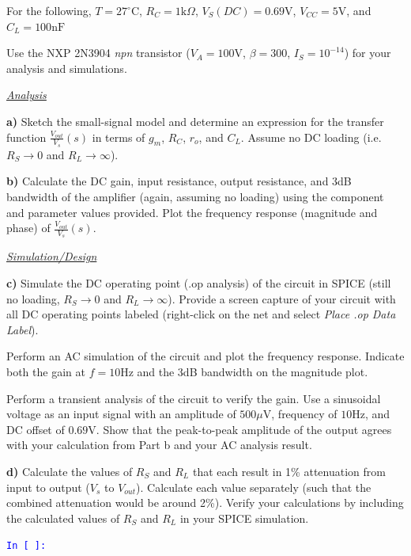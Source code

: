 \documentclass[11pt, a4paper]{article}
\begin{document}
For the following, $T = 27^\circ\text{C}$, $R_C = 1\text{k}\Omega$, $V_S(DC) = 0.69\text{V}$, $V_{CC} = 5\text{V}$, and $C_L = 100\text{nF}$

Use the NXP 2N3904 \textit{npn} transistor ($V_A = 100\text{V}$, $\beta = 300$, $I_S = 10^{-14}$) for your analysis and simulations.

\vspace{1.5em}
\underline{\textit{Analysis}}

\textbf{a)} Sketch the small-signal model and determine an expression for the transfer function $\frac{V_{out}}{V_s}(s)$ in terms of $g_m$, $R_C$, $r_o$, and $C_L$. Assume no DC loading (i.e. $R_S \rightarrow 0$ and $R_L \rightarrow \infty$).

\textbf{b)} Calculate the DC gain, input resistance, output resistance, and 3dB bandwidth of the amplifier (again, assuming no loading) using the component and parameter values provided. Plot the frequency response (magnitude and phase) of $\frac{V_{out}}{V_s}(s)$.

\vspace{1.5em}
\underline{\textit{Simulation/Design}}

\textbf{c)} Simulate the DC operating point (.op analysis) of the circuit in SPICE (still no loading, $R_S \rightarrow 0$ and $R_L \rightarrow \infty$). Provide a screen capture of your circuit with all DC operating points labeled (right-click on the net and select \textit{Place .op Data Label}).

Perform an AC simulation of the circuit and plot the frequency response. Indicate both the gain at $f = 10\text{Hz}$ and the 3dB bandwidth on the magnitude plot.

Perform a transient analysis of the circuit to verify the gain. Use a sinusoidal voltage as an input signal with an amplitude of $500\mu\text{V}$, frequency of $10\text{Hz}$, and DC offset of $0.69\text{V}$. Show that the peak-to-peak amplitude of the output agrees with your calculation from Part b and your AC analysis result.

\textbf{d)} Calculate the values of $R_S$ and $R_L$ that each result in 1\% attenuation from input to output ($V_s$ to $V_{out}$). Calculate each value separately (such that the combined attenuation would be around 2\%). Verify your calculations by including the calculated values of $R_S$ and $R_L$ in your SPICE simulation.

\vspace{2em}

\texttt{\textcolor{blue}{In [ ]:}} \framebox[\linewidth]{\rule{0pt}{1.5ex}\hspace{\linewidth}}
\end{document}
